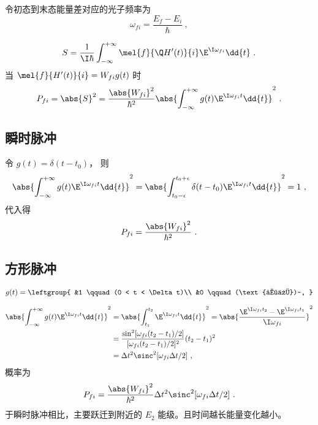 

令初态到末态能量差对应的光子频率为
\begin{equation}
\omega_{fi} = \frac{E_f - E_i}{\hbar}~,
\end{equation}

\begin{equation}
S = \frac{1}{\I\hbar} \int_{-\infty}^{+\infty} \mel{f}{\Q H'(t)}{i} \E^{\I\omega_{fi}} \dd{t}~.
\end{equation}
当 $\mel{f}{H'(t)}{i} = W_{fi} g(t)$ 时
\begin{equation}
P_{fi} = \abs{S}^2 = \frac{\abs{W_{fi}}^2}{\hbar^2} \abs{\int_{-\infty}^{+\infty} g(t) \E^{\I\omega_{fi} t} \dd{t}}^2~.
\end{equation}

\subsection{瞬时脉冲}
令 $g(t) = \delta(t-t_0)$， 则
\begin{equation}
\abs{\int_{-\infty}^{+\infty} g(t) \E^{\I\omega_{fi} t} \dd{t}}^2
= \abs{\int_{t_0-\epsilon}^{t_0+\epsilon} \delta(t-t_0) \E^{\I\omega_{fi} t} \dd{t}}^2
= 1~,
\end{equation}
代入得
\begin{equation}
P_{fi} = \frac{\abs{W_{fi}}^2}{\hbar^2}~.
\end{equation}

\subsection{方形脉冲}
\begin{equation}
g(t) = \leftgroup{
&1 \qquad (0 < t < \Delta t)\\
&0 \qquad (\text{其他})~,
}\end{equation}

\begin{equation}\begin{aligned}
\abs{\int_{-\infty}^{+\infty} g(t) \E^{\I\omega_{fi}t} \dd{t}}^2
&= \abs{\int_{t_1}^{t_2} \E^{\I\omega_{fi}t} \dd{t}}^2
= \abs{\frac{\E^{\I\omega_{fi}t_2} - \E^{\I\omega_{fi}t_1}}{\I\omega_{fi}}}^2\\
&= \frac{\sin^2[\omega_{fi}(t_2-t_1)/2]}{[\omega_{fi}(t_2-t_1)/2]^2} (t_2-t_1)^2 \\
&= \Delta t^2 \sinc^2[\omega_{fi}\Delta t/2]~,
\end{aligned}\end{equation}
概率为
\begin{equation}\label{eq_TDPEx_2}
P_{fi} = \frac{\abs{W_{fi}}^2}{\hbar^2} \Delta t^2 \sinc^2[\omega_{fi}\Delta t/2]~.
\end{equation}
于瞬时脉冲相比，主要跃迁到附近的 $E_2$ 能级。且时间越长能量变化越小。

